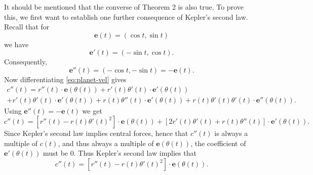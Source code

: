 \documentclass{article}
\begin{document}
It should be mentioned that the converse of Theorem 2 is also true. To prove
this, we first want to establish one further consequence of Kepler's second
law. Recall that for \[
  \mathbf{e}(t) = (\cos t, \sin t)
\] we have \[
  \mathbf{e}'(t) = (-\sin t, \cos t).
\] Consequently, \[
  \mathbf{e}''(t) = (-\cos t, -\sin t) = -\mathbf{e}(t).
\] Now differentiating \eqref{eq:planet-vel} gives
\begin{multline*}
  c''(t)
  = r''(t) \cdot \mathbf{e}(\theta(t))
  + r'(t)\theta'(t) \cdot \mathbf{e}'(\theta(t)) \\
  + r'(t)\theta'(t) \cdot \mathbf{e}'(\theta(t))
  + r(t)\theta''(t) \cdot \mathbf{e}'(\theta(t))
  + r(t)\theta'(t)\theta'(t) \cdot \mathbf{e}''(\theta(t)).
\end{multline*}
Using $\mathbf{e}''(t) = -\mathbf{e}(t)$ we get \[
  c''(t)
  = [r''(t) - r(t)\theta'(t)^2] \cdot \mathbf{e}(\theta(t))
  + [2r'(t)\theta'(t) + r(t)\theta''(t)] \cdot \mathbf{e}'(\theta(t)).
\] Since Kepler's second law implies central forces, hence that $c''(t)$ is
always a multiple of $c(t)$, and thus always a multiple of
$\mathbf{e}(\theta(t))$, the coefficient of $\mathbf{e}'(\theta(t))$ must be 0.
Thus Kepler's second law implies that
\begin{equation} \label{eq:planet-acc}
  c''(t) = [r''(t) - r(t)\theta'(t)^2] \cdot \mathbf{e}(\theta(t)).
\end{equation}
\end{document}
